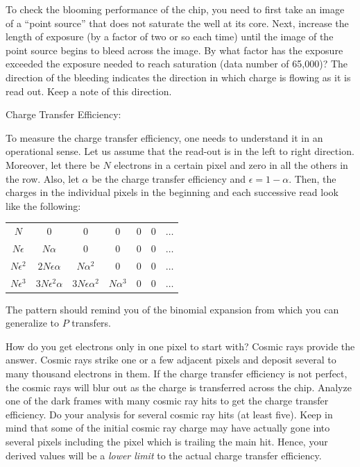 \documentclass[a4paper,12pt]{article}
\begin{document}
\begin{enumerate}
To check the blooming performance of the chip, you need to first take an image of a ``point source'' that does not saturate the well at its core. Next, increase the length of exposure (by a factor of two or so each time) until the image of the point source begins to bleed across the image. By what factor has the exposure exceeded the exposure needed to reach saturation (data number of 65,000)? The direction of the bleeding indicates the direction in which charge is flowing as it is read out. Keep a note of this direction.

{\bf \item Charge Transfer Efficiency:} To measure the charge transfer efficiency, one needs to understand it in an operational sense. Let us assume that the read-out is in the left to right direction.  Moreover, let there be $N$ electrons in a certain pixel and zero in all the others in the row. Also, let $\alpha$ be the charge transfer efficiency and $\epsilon = 1-\alpha$. Then, the charges in the individual pixels in the beginning and each successive read look like the following:
\begin{tabular*}{0.7\textwidth}{@{\extracolsep{\fill}}ccccccc}
$N$ & 0 & 0 & 0 & 0 & 0 & $\ldots$ \\
$N\epsilon$ & $N\alpha$ & 0 & 0 & 0 & 0 & $\ldots$ \\
$N\epsilon^2$ & $2N\epsilon\alpha$ & $N\alpha^2$ & 0 & 0 & 0 & $\ldots$ \\
$N\epsilon^3$ & $3N\epsilon^2\alpha$ & $3N\epsilon\alpha^2$ & $N\alpha^3$ & 0 & 0 & $\ldots$ 
\end{tabular*}

The pattern should remind you of the binomial expansion from which you can generalize to $P$ transfers. 

How do you get electrons only in one pixel to start with? Cosmic rays provide the answer. Cosmic rays strike one or a few adjacent pixels and deposit several to many thousand electrons in them. If the charge transfer efficiency is not perfect, the cosmic rays will blur out as the charge is transferred across the chip. Analyze one of the dark frames with many cosmic ray hits to get the charge transfer efficiency. Do your analysis for several cosmic ray hits (at least five). Keep in mind that some of the initial cosmic ray charge may have actually gone into several pixels including the pixel which is trailing the main hit. Hence, your derived values will be a {\it lower limit} to the actual charge transfer efficiency.

\end{enumerate}
\end{document}
